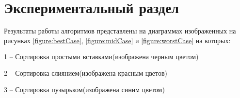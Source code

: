 \chapter{ Экспериментальный раздел}
Результаты работы алгоритмов представлены на диаграммах изображенных на рисунках \ref{figure:bestCase}, \ref{figure:midCase} и \ref{figure:worstCase} на которых:

1 -- Сортировка простыми вставками(изображена черным цветом)

2 -- Сортировка слиянием(изображена красным цветов)

3 -- Сортировка пузырьком(изображена синим цветом)

\begin{figure}[ht!]
\end{figure}

\begin{figure}[ht!]
\end{figure}

